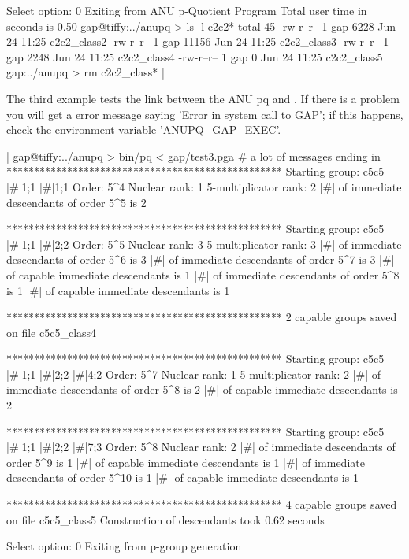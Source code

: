     Select option: 0 
    Exiting from ANU p-Quotient Program
    Total user time in seconds is 0.50
    gap@tiffy:../anupq > ls -l c2c2*
    total 45
    -rw-r--r--    1 gap   6228 Jun 24 11:25 c2c2_class2
    -rw-r--r--    1 gap  11156 Jun 24 11:25 c2c2_class3
    -rw-r--r--    1 gap   2248 Jun 24 11:25 c2c2_class4
    -rw-r--r--    1 gap      0 Jun 24 11:25 c2c2_class5
    gap:../anupq > rm c2c2_class* |

The third example tests the link between the ANU pq and {\GAP}.  If there
is a problem you will get a error message saying
'Error in  system  call  to GAP';  if this happens, check the environment
variable 'ANUPQ\_GAP\_EXEC'.

|    gap@tiffy:../anupq > bin/pq < gap/test3.pga
    # a lot of messages ending in
    **************************************************
    Starting group: c5c5 |\#|1;1 |\#|1;1
    Order: 5^4
    Nuclear rank: 1
    5-multiplicator rank: 2
    |\#| of immediate descendants of order 5^5 is 2

    **************************************************
    Starting group: c5c5 |\#|1;1 |\#|2;2
    Order: 5^5
    Nuclear rank: 3
    5-multiplicator rank: 3
    |\#| of immediate descendants of order 5^6 is 3
    |\#| of immediate descendants of order 5^7 is 3
    |\#| of capable immediate descendants is 1
    |\#| of immediate descendants of order 5^8 is 1
    |\#| of capable immediate descendants is 1

    **************************************************
    2 capable groups saved on file c5c5_class4

    **************************************************
    Starting group: c5c5 |\#|1;1 |\#|2;2 |\#|4;2
    Order: 5^7
    Nuclear rank: 1
    5-multiplicator rank: 2
    |\#| of immediate descendants of order 5^8 is 2
    |\#| of capable immediate descendants is 2

    **************************************************
    Starting group: c5c5 |\#|1;1 |\#|2;2 |\#|7;3
    Order: 5^8
    Nuclear rank: 2
    |\#| of immediate descendants of order 5^9 is 1
    |\#| of capable immediate descendants is 1
    |\#| of immediate descendants of order 5^10 is 1
    |\#| of capable immediate descendants is 1

    **************************************************
    4 capable groups saved on file c5c5_class5
    Construction of descendants took 0.62 seconds

    Select option: 0 
    Exiting from p-group generation

